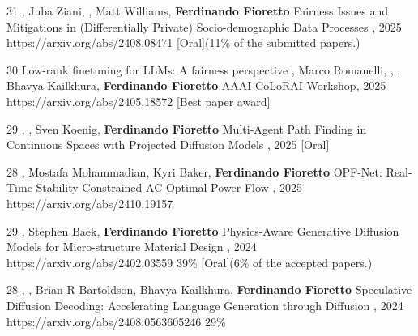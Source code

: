 \begin{pubs}

\wsentryAwd
	{31} 
	{, Juba Ziani, , Matt Williams, {\bf Ferdinando Fioretto}}
	{Fairness Issues and Mitigations in (Differentially Private) Socio-demographic Data Processes}
	{, 2025}
	{https://arxiv.org/abs/2408.08471}
	{[Oral]}{(11\% of the submitted papers.)}

\wsentryAwd
	{30}
	{Low-rank finetuning for LLMs: A fairness perspective}
	{, Marco Romanelli, , , Bhavya Kailkhura,  {\bf Ferdinando Fioretto}}
	{{\venue AAAI CoLoRAI Workshop}, 2025}
	{https://arxiv.org/abs/2405.18572}
	{[Best paper award]}{}

\wsentryAwd
	{29} 
	{, , Sven Koenig, {\bf Ferdinando Fioretto}}
	{Multi-Agent Path Finding in Continuous Spaces with Projected Diffusion Models}
	{, 2025}
	{}
	{[Oral]}{}
	
\wsentry
	{28}
	{, Mostafa Mohammadian, Kyri Baker, {\bf Ferdinando Fioretto}}
	{OPF-Net: Real-Time Stability Constrained AC Optimal Power Flow}
	{, 2025}
	{https://arxiv.org/abs/2410.19157}

\wsentryAwdAR
	{29}
	{, Stephen Baek, {\bf Ferdinando Fioretto}}
  	{Physics-Aware Generative Diffusion Models for Micro-structure Material Design}
  	{, 2024}
	{https://arxiv.org/abs/2402.03559}
	{39\%}
	{[Oral]}{(6\% of the accepted papers.)}

\wsentryAR
	{28}
	{, , Brian R Bartoldson, Bhavya Kailkhura, {\bf Ferdinando Fioretto}}
	{Speculative Diffusion Decoding: Accelerating Language Generation through Diffusion}
	{, 2024}
	{https://arxiv.org/abs/2408.0563605246}
	{29\%}


\end{pubs}
